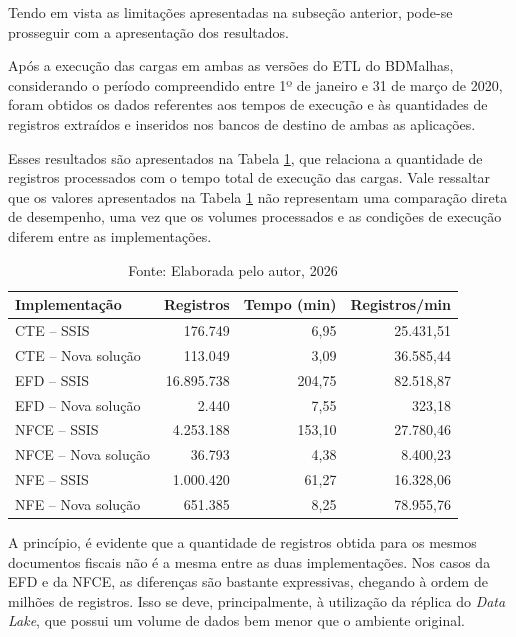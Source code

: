 Tendo em vista as limitações apresentadas na subseção anterior, pode-se prosseguir com a 
apresentação dos resultados.

Após a execução das cargas em ambas as versões do ETL do BDMalhas, considerando o período compreendido 
entre 1º de janeiro e 31 de março de 2020, foram obtidos os dados referentes aos tempos 
de execução e às quantidades de registros extraídos e inseridos nos bancos de destino de ambas as 
aplicações. 

Esses resultados são apresentados na Tabela \ref{tab:desempenho_cargas}, que relaciona a 
quantidade de registros processados com o tempo total de execução das cargas. Vale ressaltar que os 
valores apresentados na Tabela \ref{tab:desempenho_cargas} não representam uma comparação direta de 
desempenho, uma vez que os volumes processados e as condições de execução diferem entre as 
implementações.


\begin{table}[H]
\centering
\caption{Desempenho das cargas executadas nas implementações avaliadas}
\label{tab:desempenho_cargas}
\begin{tabular}{lrrr}
\toprule
\textbf{Implementação} & \textbf{Registros} & \textbf{Tempo (min)} & \textbf{Registros/min} \\
\midrule
CTE -- SSIS           &    176.749 &   6,95 & 25.431,51 \\
CTE -- Nova solução   &    113.049 &   3,09 & 36.585,44 \\
\addlinespace
EFD -- SSIS           & 16.895.738 & 204,75 & 82.518,87 \\
EFD -- Nova solução   &      2.440 &   7,55 &    323,18 \\
\addlinespace
NFCE -- SSIS          &  4.253.188 & 153,10 & 27.780,46 \\
NFCE -- Nova solução  &     36.793 &   4,38 &  8.400,23 \\
\addlinespace
NFE -- SSIS           &  1.000.420 &  61,27 & 16.328,06 \\
NFE -- Nova solução   &    651.385 &   8,25 & 78.955,76 \\
\bottomrule
\end{tabular}

\caption*{\small Fonte: Elaborada pelo autor, 2026}
\end{table}

A princípio, é evidente que a quantidade de registros obtida para os mesmos documentos fiscais não 
é a mesma entre as duas implementações. Nos casos da EFD e da NFCE, as diferenças são bastante 
expressivas, chegando à ordem de milhões de registros. Isso se deve, principalmente, à utilização 
da réplica do \textit{Data Lake}, que possui um volume de dados bem menor que o ambiente 
original.

